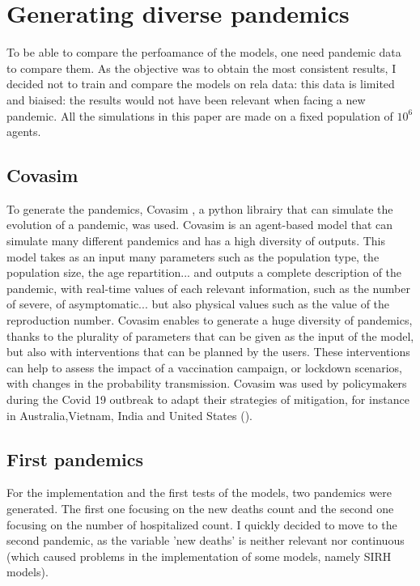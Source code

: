 \section{Generating diverse pandemics}



To be able to compare the perfoamance of the models, one need pandemic data to compare them. 
As the objective was to obtain the most consistent results, I decided not to train and compare the models on rela data: this data is limited and biaised: the results would not have been relevant when facing a new pandemic. 
All the simulations in this paper are made on a fixed population of $10^6$ agents. 

\subsection{Covasim}

To generate the pandemics,  Covasim \cite{kerr2021covasim}, a python librairy that can simulate the evolution of a pandemic, was used. 
Covasim is an agent-based model that can simulate many different pandemics and has a high diversity of outputs. 
This model takes as an input many parameters such as the population type, the population size, the age repartition... and outputs a complete description of the pandemic, with real-time values of each relevant information, such as the number of severe, of asymptomatic... but also physical values such as the value of the reproduction number. 
Covasim enables to generate a huge diversity of pandemics, thanks to the plurality of parameters that can be given as the input of the model, but also with interventions that can be planned by the users. 
These interventions can help to assess the impact of a vaccination campaign, or lockdown scenarios, with changes in the probability transmission. 
Covasim was used by policymakers during the Covid 19 outbreak to adapt their strategies of mitigation, for instance in Australia,Vietnam, India and United States (\cite{kerr2021covasim}). 

\subsection{First pandemics}

For the implementation and the first tests of the models, two pandemics were generated. 
The first one focusing on the new deaths count and the second one focusing on the number of hospitalized count. 
I quickly decided to move to the second pandemic, as the variable 'new deaths' is neither relevant nor continuous (which caused problems in the implementation of some models, namely SIRH models).


